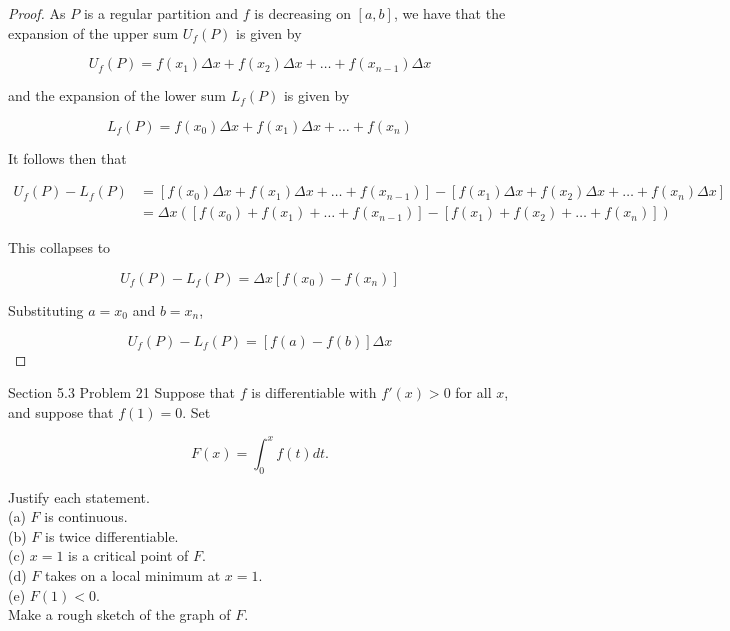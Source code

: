 \documentclass{article}
\begin{document}
    \begin{proof}
        As $P$ is a regular partition and $f$ is decreasing on $[a,b]$, we have that the expansion of the upper sum $U_f (P)$ is given by

        \[
            U_f (P) = f(x_1)\Delta x + f(x_2)\Delta x + \dots + f(x_{n-1}) \Delta x
        \]

        and the expansion of the lower sum $L_f (P)$ is given by

        \[
            L_f (P) = f(x_0)\Delta x + f(x_1) \Delta x + \dots + f(x_n)
        \]

        It follows then that

        \begin{align*}
            U_f (P) - L_f (P)   &= [f(x_0)\Delta x + f(x_1) \Delta x + \dots + f(x_{n-1})] - [f(x_1)\Delta x + f(x_2)\Delta x + \dots + f(x_n) \Delta x] \\
                                &= \Delta x([f(x_0) + f(x_1) + \dots + f(x_{n-1})] - [f(x_1) + f(x_2) + \dots + f(x_n)])
        \end{align*}

        This collapses to

        \[
            U_f (P) - L_f (P) = \Delta x [f(x_0) - f(x_n)]
        \]

        Substituting $a=x_0$ and $b=x_n$,

        \[
            U_f (P) - L_f (P) = [f(a)-f(b)]\Delta x
        \]
    \end{proof}




    \begin{tbhtheorem}{Section 5.3 Problem 21}
        Suppose that $f$ is differentiable with $f'(x)>0$ for all $x$, and suppose that $f(1)=0$. Set

        \[
            F(x) = \int^x_0 f(t)dt.
        \]

        Justify each statement. \\
        (a) $F$ is continuous. \\
        (b) $F$ is twice differentiable. \\
        (c) $x=1$ is a critical point of $F$. \\
        (d) $F$ takes on a local minimum at $x=1$. \\
        (e) $F(1)<0$. \\

        Make a rough sketch of the graph of $F$.
    \end{tbhtheorem}
\end{document}
